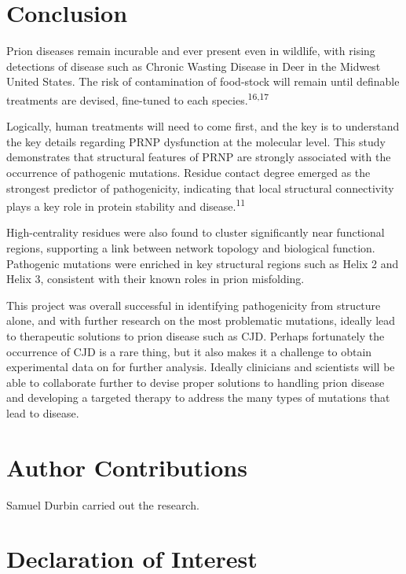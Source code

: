 \documentclass[
  twocolumn]{biophys-new-mod}
\begin{document}
\section{Conclusion}\label{conclusion}

Prion diseases remain incurable and ever present even in wildlife, with
rising detections of disease such as Chronic Wasting Disease in Deer in
the Midwest United States. The risk of contamination of food-stock will
remain until definable treatments are devised, fine-tuned to each
species.\textsuperscript{16,17}

Logically, human treatments will need to come first, and the key is to
understand the key details regarding PRNP dysfunction at the molecular
level. This study demonstrates that structural features of PRNP are
strongly associated with the occurrence of pathogenic mutations. Residue
contact degree emerged as the strongest predictor of pathogenicity,
indicating that local structural connectivity plays a key role in
protein stability and disease.\textsuperscript{11}

High-centrality residues were also found to cluster significantly near
functional regions, supporting a link between network topology and
biological function. Pathogenic mutations were enriched in key
structural regions such as Helix 2 and Helix 3, consistent with their
known roles in prion misfolding.

This project was overall successful in identifying pathogenicity from
structure alone, and with further research on the most problematic
mutations, ideally lead to therapeutic solutions to prion disease such
as CJD. Perhaps fortunately the occurrence of CJD is a rare thing, but
it also makes it a challenge to obtain experimental data on for further
analysis. Ideally clinicians and scientists will be able to collaborate
further to devise proper solutions to handling prion disease and
developing a targeted therapy to address the many types of mutations
that lead to disease.

\section{Author Contributions}\label{author-contributions}

Samuel Durbin carried out the research.

\section{Declaration of Interest}\label{declaration-of-interest}
\end{document}

